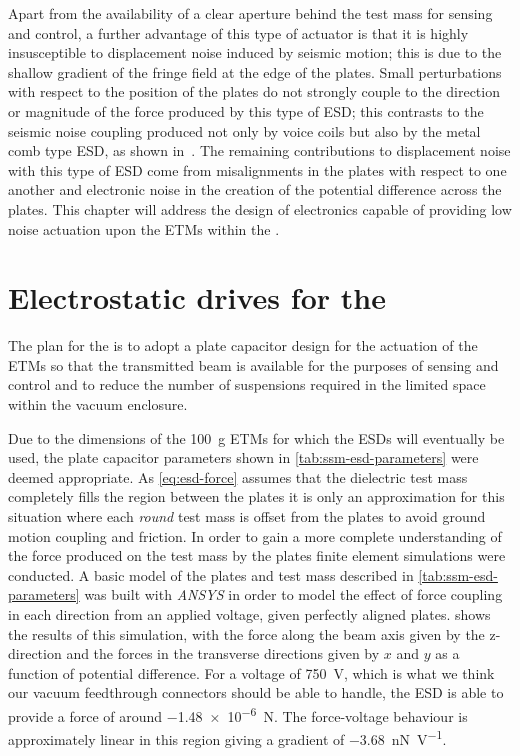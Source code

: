 Apart from the availability of a clear aperture behind the test mass for sensing and control, a further advantage of this type of actuator is that it is highly insusceptible to displacement noise induced by seismic motion; this is due to the shallow gradient of the fringe field at the edge of the plates. Small perturbations with respect to the position of the plates do not strongly couple to the direction or magnitude of the force produced by this type of \gls{ESD}; this contrasts to the seismic noise coupling produced not only by voice coils but also by the metal comb type \gls{ESD}, as shown in~\cite{Wittel2015}. The remaining contributions to displacement noise with this type of \gls{ESD} come from misalignments in the plates with respect to one another and electronic noise in the creation of the potential difference across the plates. This chapter will address the design of electronics capable of providing low noise actuation upon the \glspl{ETM} within the \SSMEXPT{}.

\section{Electrostatic drives for the \SSMEXPT{}}
The plan for the \SSMEXPT{} is to adopt a plate capacitor design for the actuation of the \glspl{ETM} so that the transmitted beam is available for the purposes of sensing and control and to reduce the number of suspensions required in the limited space within the vacuum enclosure.

Due to the dimensions of the \SI{100}{\gram} \glspl{ETM} for which the \glspl{ESD} will eventually be used, the plate capacitor parameters shown in \cref{tab:ssm-esd-parameters} were deemed appropriate. As \cref{eq:esd-force} assumes that the dielectric test mass completely fills the region between the plates it is only an approximation for this situation where each \emph{round} test mass is offset from the plates to avoid ground motion coupling and friction. In order to gain a more complete understanding of the force produced on the test mass by the plates finite element simulations were conducted. A basic model of the plates and test mass described in \cref{tab:ssm-esd-parameters} was built with \emph{ANSYS} in order to model the effect of force coupling in each direction from an applied voltage, given perfectly aligned plates.  shows the results of this simulation, with the force along the beam axis given by the z-direction and the forces in the transverse directions given by $x$ and $y$ as a function of potential difference. For a voltage of \SI{750}{\volt}, which is what we think our vacuum feedthrough connectors should be able to handle, the \gls{ESD} is able to provide a force of around \SI{-1.48e-6}{\newton}. The force-voltage behaviour is approximately linear in this region giving a gradient of \SI{-3.68}{\nano\newton\per\volt}.

